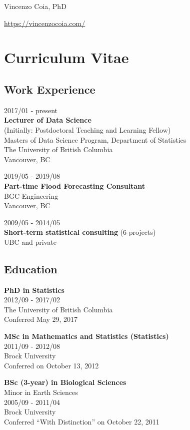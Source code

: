 \documentclass[]{article}
\begin{document}
Vincenzo Coia, PhD

\url{https://vincenzocoia.com/}

\hypertarget{curriculum-vitae}{%
\section{Curriculum Vitae}\label{curriculum-vitae}}

\hypertarget{work-experience}{%
\subsection{Work Experience}\label{work-experience}}

2017/01 - present\\
\textbf{Lecturer of Data Science}\\
(Initially: Postdoctoral Teaching and Learning Fellow)\\
Masters of Data Science Program, Department of Statistics\\
The University of British Columbia\\
Vancouver, BC

2019/05 - 2019/08\\
\textbf{Part-time Flood Forecasting Consultant}\\
BGC Engineering\\
Vancouver, BC

2009/05 - 2014/05\\
\textbf{Short-term statistical consulting} (6 projects)\\
UBC and private

\hypertarget{education}{%
\subsection{Education}\label{education}}

\textbf{PhD in Statistics}\\
2012/09 - 2017/02\\
The University of British Columbia\\
Conferred May 29, 2017

\textbf{MSc in Mathematics and Statistics (Statistics)}\\
2011/09 - 2012/08\\
Brock University\\
Conferred on October 13, 2012

\textbf{BSc (3-year) in Biological Sciences}\\
Minor in Earth Sciences\\
2005/09 - 2011/04\\
Brock University\\
Conferred ``With Distinction'' on October 22, 2011
\end{document}
